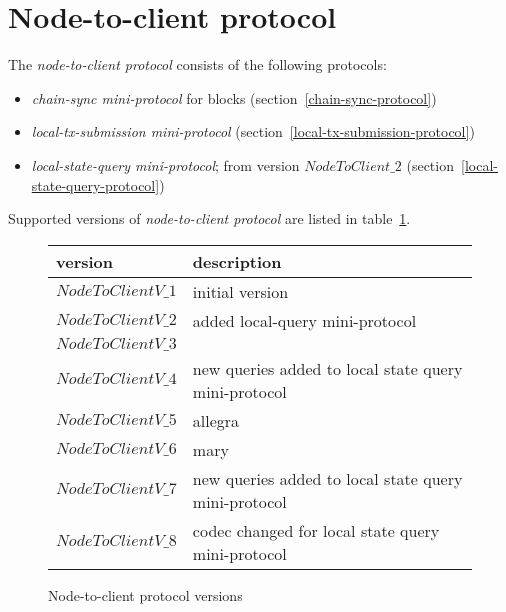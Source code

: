 \section{Node-to-client protocol}
\label{section:node-to-client-protocol}
\newline
{}\newline

The \textit{node-to-client protocol} consists of the following protocols:
\begin{itemize}
  \item \textit{chain-sync mini-protocol} for blocks (section~\ref{chain-sync-protocol})
  \item \textit{local-tx-submission mini-protocol} (section~\ref{local-tx-submission-protocol})
  \item \textit{local-state-query mini-protocol}; from version $NodeToClient\_2$ (section~\ref{local-state-query-protocol})
\end{itemize}
Supported versions of \textit{node-to-client protocol} are listed in
table~\ref{table:node-to-client-protocol-versions}.
\begin{figure}[h]
  \begin{center}
    \begin{tabular}{l|l}
      version & description \\\hline\hline
      $NodeToClientV\_1$ & initial version\\\hline
      $NodeToClientV\_2$ & added local-query mini-protocol\\\hline
      $NodeToClientV\_3$ & \\\hline
      $NodeToClientV\_4$ & new queries added to local state query mini-protocol\\\hline
      $NodeToClientV\_5$ & allegra \\\hline
      $NodeToClientV\_6$ & mary \\\hline
      $NodeToClientV\_7$ & new queries added to local state query mini-protocol\\\hline
      $NodeToClientV\_8$ & codec changed for local state query mini-protocol\\\hline
    \end{tabular}
    \caption{Node-to-client protocol versions}
    \label{table:node-to-client-protocol-versions}
  \end{center}
\end{figure}
